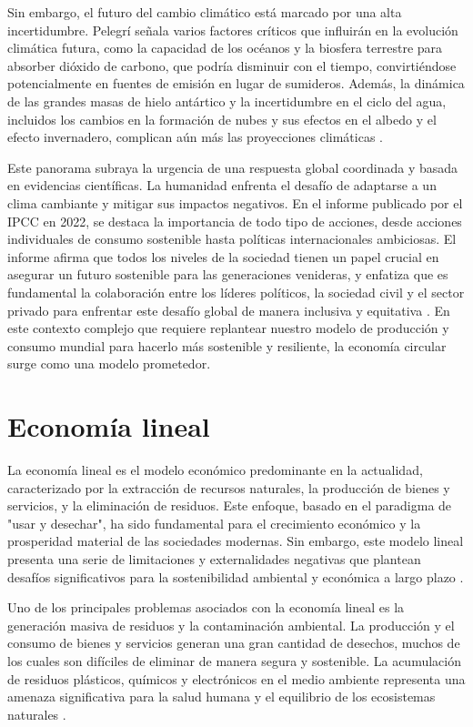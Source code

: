 \documentclass[main.tex]{subfiles}
\begin{document}
Sin embargo, el futuro del cambio climático está marcado por una alta incertidumbre. Pelegrí señala varios factores críticos que influirán en la evolución climática futura, como la capacidad de los océanos y la biosfera terrestre para absorber dióxido de carbono, que podría disminuir con el tiempo, convirtiéndose potencialmente en fuentes de emisión en lugar de sumideros. Además, la dinámica de las grandes masas de hielo antártico y la incertidumbre en el ciclo del agua, incluidos los cambios en la formación de nubes y sus efectos en el albedo y el efecto invernadero, complican aún más las proyecciones climáticas \cite{pelegri2021ipcc}.

Este panorama subraya la urgencia de una respuesta global coordinada y basada en evidencias científicas. La humanidad enfrenta el desafío de adaptarse a un clima cambiante y mitigar sus impactos negativos. En el informe publicado por el IPCC en 2022, se destaca la importancia de todo tipo de acciones, desde acciones individuales de consumo sostenible hasta políticas internacionales ambiciosas. El informe afirma que todos los niveles de la sociedad tienen un papel crucial en asegurar un futuro sostenible para las generaciones venideras, y enfatiza que es fundamental la colaboración entre los líderes políticos, la sociedad civil y el sector privado para enfrentar este desafío global de manera inclusiva y equitativa \cite{IPCC2022, pelegri2021ipcc}. En este contexto complejo que requiere replantear nuestro modelo de producción y consumo mundial para hacerlo más sostenible y resiliente, la economía circular surge como una modelo prometedor. 

\section{Economía lineal}

La economía lineal es el modelo económico predominante en la actualidad, caracterizado por la extracción de recursos naturales, la producción de bienes y servicios, y la eliminación de residuos. Este enfoque, basado en el paradigma de "usar y desechar", ha sido fundamental para el crecimiento económico y la prosperidad material de las sociedades modernas. Sin embargo, este modelo lineal presenta una serie de limitaciones y externalidades negativas que plantean desafíos significativos para la sostenibilidad ambiental y económica a largo plazo \cite{cerda2016economia}.

Uno de los principales problemas asociados con la economía lineal es la generación masiva de residuos y la contaminación ambiental. La producción y el consumo de bienes y servicios generan una gran cantidad de desechos, muchos de los cuales son difíciles de eliminar de manera segura y sostenible. La acumulación de residuos plásticos, químicos y electrónicos en el medio ambiente representa una amenaza significativa para la salud humana y el equilibrio de los ecosistemas naturales \cite{clima2022book}.
\end{document}
